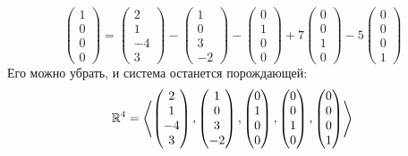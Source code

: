 $$
\begin{pmatrix}
	1 \\
    0 \\
    0 \\
    0
\end{pmatrix} =
\begin{pmatrix}
	2 \\
    1 \\
    -4 \\
    3
\end{pmatrix} -
\begin{pmatrix}
	1 \\
    0 \\
    3 \\
    -2
\end{pmatrix} -
\begin{pmatrix}
	0 \\
    1 \\
    0 \\
    0
\end{pmatrix} + 7
\begin{pmatrix}
	0 \\
    0 \\
    1 \\
    0
\end{pmatrix} - 5
\begin{pmatrix}
	0 \\
    0 \\
    0 \\
    1
\end{pmatrix} $$
Его можно убрать, и система останется порождающей:
$$ \mathbb{R}^4 = \left\langle
\begin{pmatrix}
	2 \\
    1 \\
    -4 \\
    3
\end{pmatrix},
\begin{pmatrix}
	1 \\
    0 \\
    3 \\
    -2
\end{pmatrix},
\begin{pmatrix}
	0 \\
    1 \\
    0 \\
    0
\end{pmatrix},
\begin{pmatrix}
	0 \\
    0 \\
    1 \\
    0
\end{pmatrix},
\begin{pmatrix}
	0 \\
    0 \\
    0 \\
    1
\end{pmatrix} \right\rangle $$

